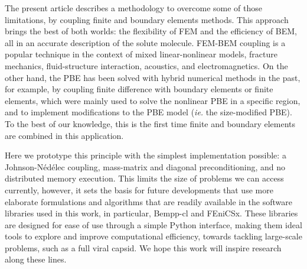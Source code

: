 The present article describes a methodology to overcome some of those limitations, by coupling finite and boundary elements methods.
This approach brings the best of both worlds: the flexibility of FEM and the efficiency of BEM, all in an accurate description of the solute molecule.
FEM-BEM coupling is a popular technique in the context of mixed linear-nonlinear models,\cite{carstensen1995coupling,aurada2013classical} fracture mechanics,\cite{aour2007coupled} fluid-structure interaction,\cite{estorff1991fem} acoustics,\cite{hiptmair2006stabilized} and electromagnetics.\cite{matsuoka1988calculation,hiptmair2008stabilized,bruckner20123d}
On the other hand, the PBE has been solved with hybrid numerical methods in the past, for example, by coupling finite difference with boundary elements\cite{boschitsch2004hybrid} or finite elements,\cite{xie2016new,ying2018hybrid} which were mainly used to solve the nonlinear PBE in a specific region, and to implement modifications to the PBE model ({\it ie.} the size-modified PBE).
To the best of our knowledge, this is the first time finite and boundary elements are combined in this application.

Here we prototype this principle with the simplest implementation possible: a Johnson-N\'ed\'elec\cite{johnson1980coupling} coupling, mass-matrix and diagonal preconditioning, and no distributed memory execution. 
This limits the size of problems we can access currently, however, it sets the basis for future developments that use more elaborate formulations and algorithms that are readily available in the software libraries used in this work, in particular, Bempp-cl and FEniCSx.
These libraries are designed for ease of use through a simple Python interface, making them ideal tools to explore and improve computational efficiency, towards tackling large-scale problems, such as a full viral capsid.\cite{MartinezETal2019,wang2021high}
We hope this work will inspire research along these lines.
